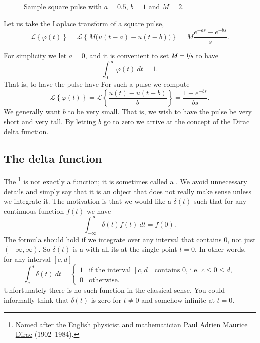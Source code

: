 \documentclass[12pt]{book}
\begin{document}
\begin{figure}[h!t]
\begin{center}
\capstart
{}
\caption{Sample square pulse with $a=0.5$, $b=1$ and $M = 2$.\label{lt:sqpulse}}
\end{center}
\end{figure}

Let us take the Laplace transform of a square pulse,
\begin{equation*}
{\mathcal{L}} \left\{ \varphi(t) \right\}
=
{\mathcal{L}} \left\{ M \bigl( u(t-a) - u(t-b) \bigr)  \right\}
=
M
\frac{e^{-as} - e^{-bs}}{s} .
\end{equation*}

For simplicity we let $a=0$, and it is convenient
to set $M = \nicefrac{1}{b}$ to have
\begin{equation*}
\int_0^\infty \varphi(t) ~dt = 1 .
\end{equation*}
That is, to have the pulse have 
For such a pulse we
compute
\begin{equation*}
{\mathcal{L}} \left\{ \varphi(t) \right\}
=
{\mathcal{L}} \left\{ \frac{u(t) - u(t-b)}{b}  \right\}
=
\frac{1 - e^{-bs}}{bs} .
\end{equation*}
We generally want $b$ to be very small.  That is, we wish to have
the pulse be very short and very tall.  By letting $b$ go to zero we arrive
at the concept of the Dirac delta function.

\subsection{The delta function}

The \emph{}%
\footnote{Named after the English physicist and mathematician
\href{http://en.wikipedia.org/wiki/Paul_Dirac}{Paul Adrien Maurice Dirac}
(1902--1984).}
is not exactly a function; it is sometimes called a
\emph{}.  We
avoid unnecessary details and simply say that it is an object
that does not really make sense unless we integrate it.  The motivation is
that we would like a  $\delta(t)$
such that 
for any continuous function $f(t)$ we have
\begin{equation*}
\boxed{~~
\int_{-\infty}^\infty \delta(t) f(t) ~dt = f(0) .
~~}
\end{equation*}
The formula should hold if we integrate over any interval that contains 0,
not just $(-\infty,\infty)$.
So $\delta(t)$ is a  
with all its  at the single point $t=0$.  In other words, for any
interval $[c,d]$
\begin{equation*}
\int_c^d \delta(t) ~dt = 
\begin{cases}
1 & \text{if the interval $[c,d]$ contains 0, i.e. } c \leq 0 \leq d, \\
0 & \text{otherwise.}
\end{cases}
\end{equation*}
Unfortunately there is no such function in the classical sense.  You could
informally think that $\delta(t)$ is zero for $t\not=0$ and somehow
infinite at $t=0$.
\end{document}
